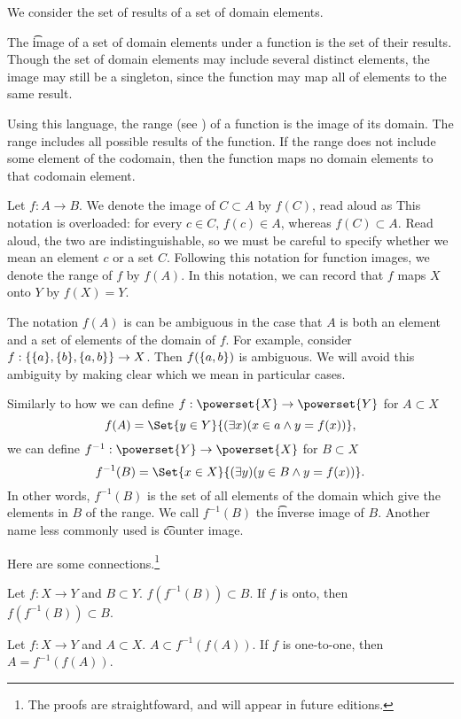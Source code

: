 

We consider the set of results of a set of domain elements.


The \t{image} of a set of domain elements under a function is the set of their results.
Though the set of domain elements may include several distinct elements, the image may still be a singleton, since the function may map all of elements to the same result.

Using this language, the range (see ) of a function is the image of its domain.
The range includes all possible results of the function.
If the range does not include some element of the codomain, then the function maps no domain elements to that codomain element.


Let $f: A \to B$.
We denote the image of $C \subset A$ by $f(C)$, read aloud as 
This notation is overloaded: for every $c \in C$, $f(c) \in A$, whereas $f(C) \subset A$.
Read aloud, the two are indistinguishable, so we must be careful to specify whether we mean an element $c$ or a set $C$.
Following this notation for function images, we denote the range of $f$ by $f(A)$.
In this notation, we can record that $f$ maps $X$ onto $Y$ by $f(X) = Y$.


The notation $f(A)$ is can be ambiguous in the case that $A$ is both an element and a set of elements of the domain of $f$.
For example, consider $f: \{\{a\}, \{b\}, \{a, b\}\} \to X$.
Then $f(\{a, b\})$ is ambiguous.
We will avoid this ambiguity by making clear which we mean in particular cases.



Similarly to how we can define $f: \powerset{X} \to \powerset{Y}$ for $A \subset X$
\[
  f(A) = \Set{y \in Y}{(\exists x)(x \in a \land y = f(x))},
\]
we can define $f^{-1}: \powerset{Y} \to \powerset{X}$ for $B \subset X$
\[
  f^{-1}(B) = \Set{x \in X}{(\exists y)(y \in B \land y = f(x))}.
\]
In other words, $f^{-1}(B)$ is the set of all elements of the domain which give the elements in $B$ of the range.
We call $f^{-1}(B)$ the \t{inverse image} of $B$.
Another name less commonly used is \t{counter image}.

Here are some connections.\footnote{The proofs are straightfoward, and will appear in future editions.}

\begin{proposition}
  Let $f: X \to Y$ and $B \subset Y$.
  $f(f^{-1}(B)) \subset B$. If $f$ is onto, then $f(f^{-1}(B)) \subset B$.
\end{proposition}
\begin{proposition}
  Let $f: X \to Y$ and $A \subset X$.
  $A \subset f^{-1}(f(A))$.
  If $f$ is one-to-one, then $A = f^{-1}(f(A))$.
\end{proposition}
